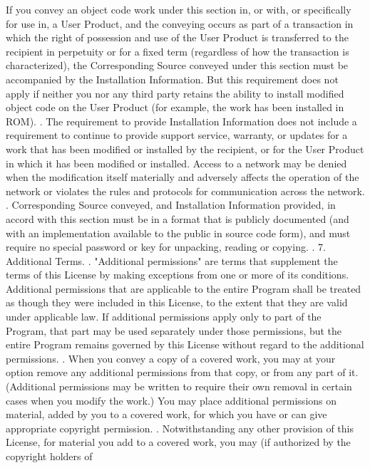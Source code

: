 \begin{script}
   If you convey an object code work under this section in, or with, or
 specifically for use in, a User Product, and the conveying occurs as
 part of a transaction in which the right of possession and use of the
 User Product is transferred to the recipient in perpetuity or for a
 fixed term (regardless of how the transaction is characterized), the
 Corresponding Source conveyed under this section must be accompanied
 by the Installation Information.  But this requirement does not apply
 if neither you nor any third party retains the ability to install
 modified object code on the User Product (for example, the work has
 been installed in ROM).
 .
   The requirement to provide Installation Information does not include a
 requirement to continue to provide support service, warranty, or updates
 for a work that has been modified or installed by the recipient, or for
 the User Product in which it has been modified or installed.  Access to a
 network may be denied when the modification itself materially and
 adversely affects the operation of the network or violates the rules and
 protocols for communication across the network.
 .
   Corresponding Source conveyed, and Installation Information provided,
 in accord with this section must be in a format that is publicly
 documented (and with an implementation available to the public in
 source code form), and must require no special password or key for
 unpacking, reading or copying.
 .
   7. Additional Terms.
 .
   "Additional permissions" are terms that supplement the terms of this
 License by making exceptions from one or more of its conditions.
 Additional permissions that are applicable to the entire Program shall
 be treated as though they were included in this License, to the extent
 that they are valid under applicable law.  If additional permissions
 apply only to part of the Program, that part may be used separately
 under those permissions, but the entire Program remains governed by
 this License without regard to the additional permissions.
 .
   When you convey a copy of a covered work, you may at your option
 remove any additional permissions from that copy, or from any part of
 it.  (Additional permissions may be written to require their own
 removal in certain cases when you modify the work.)  You may place
 additional permissions on material, added by you to a covered work,
 for which you have or can give appropriate copyright permission.
 .
   Notwithstanding any other provision of this License, for material you
 add to a covered work, you may (if authorized by the copyright holders of

\end{script}
